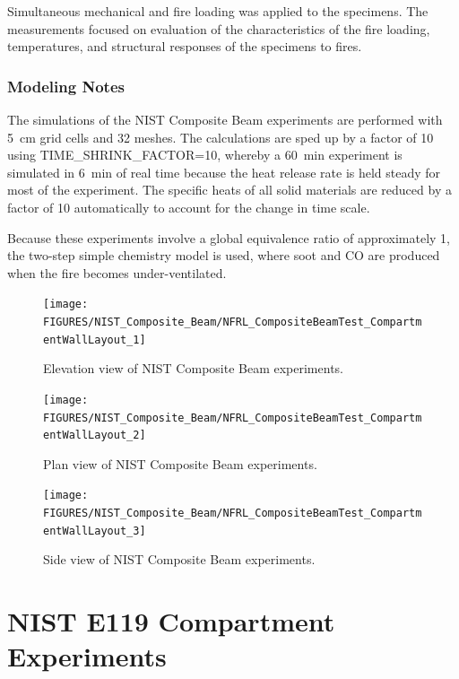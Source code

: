 Simultaneous mechanical and fire loading was applied to the specimens. The measurements focused on evaluation of the characteristics of the fire loading, temperatures, and structural responses of the specimens to fires.

\subsubsection{Modeling Notes}

The simulations of the NIST Composite Beam experiments are performed with 5~cm grid cells and 32 meshes. The calculations are sped up by a factor of 10 using {\ct TIME\_SHRINK\_FACTOR=10}, whereby a 60~min experiment is simulated in 6~min of real time because the heat release rate is held steady for most of the experiment. The specific heats of all solid materials are reduced by a factor of 10 automatically to account for the change in time scale.

Because these experiments involve a global equivalence ratio of approximately 1, the two-step simple chemistry model is used, where soot and CO are produced when the fire becomes under-ventilated.

\begin{figure}
\texttt{[image: FIGURES/NIST\_Composite\_Beam/NFRL\_CompositeBeamTest\_CompartmentWallLayout\_1]}
\caption[Elevation view of NIST Composite Beam experiments]{Elevation view of NIST Composite Beam experiments.}
\label{NIST_Composite_Beam_Drawing_1}
\end{figure}

\begin{figure}
\texttt{[image: FIGURES/NIST\_Composite\_Beam/NFRL\_CompositeBeamTest\_CompartmentWallLayout\_2]}
\caption[Plan view of NIST Composite Beam experiments]{Plan view of NIST Composite Beam experiments.}
\label{NIST_Composite_Beam_Drawing_2}
\end{figure}

\begin{figure}
\texttt{[image: FIGURES/NIST\_Composite\_Beam/NFRL\_CompositeBeamTest\_CompartmentWallLayout\_3]}
\caption[Side view of NIST Composite Beam experiments]{Side view of NIST Composite Beam experiments.}
\label{NIST_Composite_Beam_Drawing_3}
\end{figure}

\section{NIST E119 Compartment Experiments}
\label{NIST_E119_Compartment_Description}

